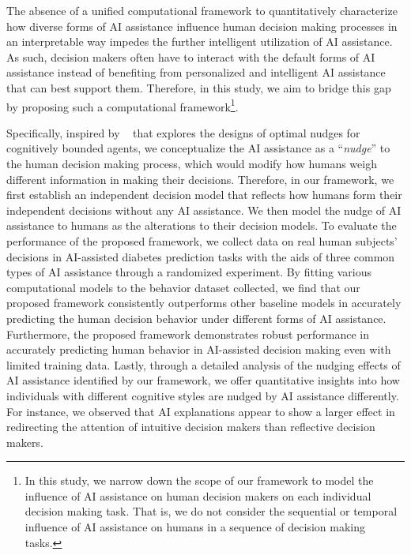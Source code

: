 \documentclass[letterpaper]{article} %
\begin{document}
The absence of a unified computational framework to quantitatively characterize how diverse forms of AI assistance influence human decision making processes in an interpretable way impedes the further intelligent utilization of AI assistance. As such, decision makers often have to interact with the default forms of AI assistance instead of benefiting from personalized and intelligent AI assistance that can best support them.
Therefore, in this study, we aim to bridge this gap by proposing such a computational framework\footnote{In this study, we narrow down the scope of our framework to model the influence of AI assistance on human decision makers on each individual decision making task. That is, we do not consider the sequential or temporal influence of AI assistance on humans in a sequence of decision making tasks.
}.


Specifically, inspired by \citeauthor{callaway2022optimal}~ that explores the designs of optimal nudges for cognitively bounded agents, we conceptualize the AI assistance as a ``{\em nudge}'' to the human decision making process, which would modify how humans weigh different information in making their decisions.
Therefore, in our framework, we first establish an independent decision model that reflects how humans form their independent decisions without any AI assistance. We then model the nudge of AI assistance to humans as the alterations to their decision models.
To evaluate the performance of the proposed framework, we collect data on real human subjects' decisions in AI-assisted diabetes prediction tasks with the aids of three common types of AI assistance through a randomized experiment. By fitting various computational models to the behavior dataset collected, we find that our proposed framework consistently outperforms other baseline models in accurately predicting the human decision behavior under different forms of AI assistance. Furthermore,
the proposed framework demonstrates robust performance in accurately predicting human behavior in AI-assisted decision making even with limited training data. Lastly, through a detailed analysis of the nudging effects of AI assistance identified by our framework, we offer quantitative insights into how individuals with different cognitive styles are nudged by AI assistance differently. For instance, we observed that
AI explanations appear to show a larger effect in redirecting the attention of intuitive
decision makers than reflective decision makers.
\end{document}
